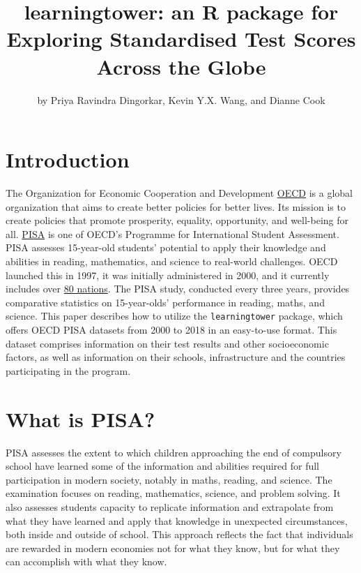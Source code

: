 \title{learningtower: an R package for Exploring Standardised Test
Scores Across the Globe}
\author{by Priya Ravindra Dingorkar, Kevin Y.X. Wang, and Dianne Cook}

\maketitle


\hypertarget{introduction}{%
\section{Introduction}\label{introduction}}

The Organization for Economic Cooperation and Development
\href{OECD\%20-\%20https://www.oecd.org/about/}{OECD} is a global
organization that aims to create better policies for better lives. Its
mission is to create policies that promote prosperity, equality,
opportunity, and well-being for all.
\href{PISA\%20-\%20https://www.oecd.org/pisa/}{PISA} is one of OECD's
Programme for International Student Assessment. PISA assesses
15-year-old students' potential to apply their knowledge and abilities
in reading, mathematics, and science to real-world challenges. OECD
launched this in 1997, it was initially administered in 2000, and it
currently includes over
\href{https://www.oecd.org/pisa/aboutpisa/pisa-participants.htm}{80
nations}. The PISA study, conducted every three years, provides
comparative statistics on 15-year-olds' performance in reading, maths,
and science. This paper describes how to utilize the
\texttt{learningtower} package, which offers OECD PISA datasets from
2000 to 2018 in an easy-to-use format. This dataset comprises
information on their test results and other socioeconomic factors, as
well as information on their schools, infrastructure and the countries
participating in the program.

\hypertarget{what-is-pisa}{%
\section{What is PISA?}\label{what-is-pisa}}

PISA assesses the extent to which children approaching the end of
compulsory school have learned some of the information and abilities
required for full participation in modern society, notably in maths,
reading, and science. The examination focuses on reading, mathematics,
science, and problem solving. It also assesses students capacity to
replicate information and extrapolate from what they have learned and
apply that knowledge in unexpected circumstances, both inside and
outside of school. This approach reflects the fact that individuals are
rewarded in modern economies not for what they know, but for what they
can accomplish with what they know.

